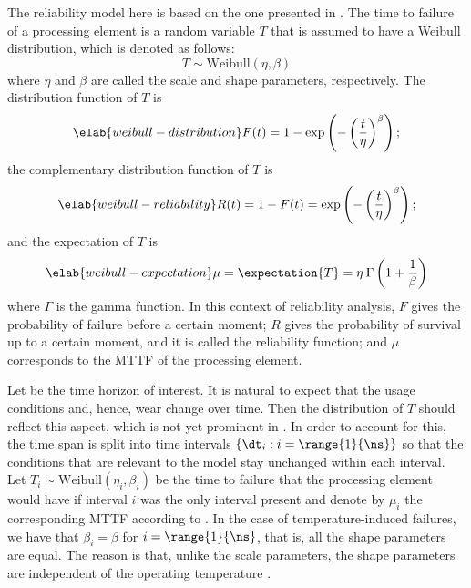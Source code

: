 \newcommand{\mean}{\mu}
\newcommand{\scale}{\eta}
\newcommand{\shape}{\beta}
The reliability model here is based on the one presented in \cite{huang2009b,
xiang2010}. The time to failure of a processing element is a random variable $T$
that is assumed to have a Weibull distribution, which is denoted as follows:
\[
  T \sim \mathrm{Weibull}(\scale, \shape)
\]
where $\scale$ and $\shape$ are called the scale and shape parameters,
respectively. The distribution function of $T$ is
\begin{equation} \elab{weibull-distribution}
  F(t) = 1 - \exp\left(-\left(\frac{t}{\scale}\right)^\shape\right);
\end{equation}
the complementary distribution function of $T$ is
\begin{equation} \elab{weibull-reliability}
  R(t) = 1 - F(t) = \exp\left(-\left(\frac{t}{\scale}\right)^\shape\right);
\end{equation}
and the expectation of $T$ is
\begin{equation} \elab{weibull-expectation}
  \mean = \expectation{T} = \scale \: \Gamma\left(1 + \frac{1}{\shape}\right)
\end{equation}
where $\Gamma$ is the gamma function. In this context of reliability analysis,
$F$ gives the probability of failure before a certain moment; $R$ gives the
probability of survival up to a certain moment, and it is called the reliability
function; and $\mean$ corresponds to the \ac{MTTF} of the processing element.

Let \period be the time horizon of interest. It is natural to expect that the
usage conditions and, hence, wear change over time. Then the distribution of $T$
should reflect this aspect, which is not yet prominent in
. In order to account for this, the time span is
split into \ns time intervals $\{ \dt_i: i = \range{1}{\ns} \}$ so that the
conditions that are relevant to the model stay unchanged within each interval.
Let $T_i \sim \mathrm{Weibull}(\scale_i, \shape_i)$ be the time to failure that
the processing element would have if interval $i$ was the only interval present
and denote by $\mean_i$ the corresponding \ac{MTTF} according to
. In the case of temperature-induced failures, we have
that $\shape_i = \shape$ for $i = \range{1}{\ns}$, that is, all the shape
parameters are equal. The reason is that, unlike the scale parameters, the shape
parameters are independent of the operating temperature \cite{chang2006}.

